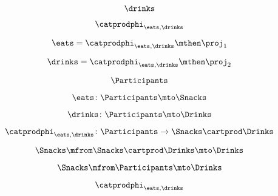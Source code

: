 \begin{forslides}
    \begin{equation}
        \label{eq:systems-047}
        \drinks
    \end{equation}

    \begin{equation}
        \label{eq:systems-048}
        \catprodphi_{\eats,\drinks}
    \end{equation}

    \begin{equation}
        \label{eq:systems-049}
        \eats =\catprodphi_{\eats,\drinks}\mthen \proj_1
    \end{equation}

    \begin{equation}
        \label{eq:systems-050}
        \drinks=\catprodphi_{\eats,\drinks}\mthen \proj_2
    \end{equation}

    \begin{equation}
        \label{eq:systems-051}
        \Participants
    \end{equation}

    \begin{equation}
        \label{eq:systems-052}
        \eats\colon \Participants \mto \Snacks
    \end{equation}

    \begin{equation}
        \label{eq:systems-053}
        \drinks\colon \Participants \mto \Drinks
    \end{equation}

    \begin{equation}
        \label{eq:systems-054}
        \catprodphi_{\eats,\drinks} \colon \Participants \to \Snacks \cartprod \Drinks
    \end{equation}

    \begin{equation}
        \label{eq:systems-055}
        \Snacks \mfrom \Snacks \cartprod \Drinks \mto \Drinks
    \end{equation}

    \begin{equation}
        \label{eq:systems-056}
        \Snacks \mfrom  \Participants \mto \Drinks
    \end{equation}

    \begin{equation}
        \label{eq:systems-057}
        \catprodphi_{\eats,\drinks}
    \end{equation}


\end{forslides}
